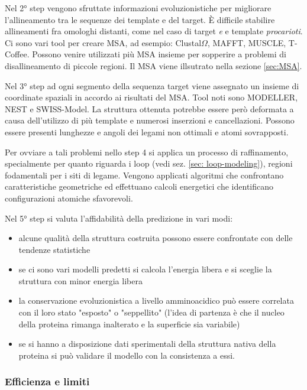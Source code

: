 \par Nel 2° step vengono sfruttate informazioni evoluzionistiche per migliorare l'allineamento tra le sequenze dei template e del target. È difficile stabilire allineamenti fra omologhi distanti, come nel caso di target \textit{e} e template \textit{procarioti}. Ci sono vari tool per creare MSA, ad esempio: Clustal$\Omega$, MAFFT, MUSCLE, T-Coffee. Possono venire utilizzati più MSA insieme per sopperire a problemi di disallineamento di piccole regioni. Il MSA viene illsutrato nella sezione \ref{sec:MSA}.

\par Nel 3° step ad ogni segmento della sequenza target viene assegnato un insieme di coordinate spaziali in accordo ai risultati del MSA. Tool noti sono MODELLER, NEST e SWISS-Model. La struttura ottenuta potrebbe essere però deformata a causa dell'utilizzo di più template e numerosi inserzioni e cancellazioni. Possono essere presenti lunghezze e angoli dei legami non ottimali e atomi sovrapposti.

\par Per ovviare a tali problemi nello step 4 si applica un processo di raffinamento, specialmente per quanto riguarda i loop (vedi sez. \ref{sec: loop-modeling}), regioni fodamentali per i siti di legame. Vengono applicati algoritmi che confrontano caratteristiche geometriche ed effettuano calcoli energetici che identificano configurazioni atomiche sfavorevoli. 

\par Nel 5° step si valuta l'affidabilità della predizione in vari modi:
\begin{itemize}
	\item alcune qualità della struttura costruita possono essere confrontate con delle tendenze statistiche
	\item se ci sono vari modelli predetti si calcola l'energia libera e si sceglie la struttura con minor energia libera
	\item la conservazione evoluzionistica a livello amminoacidico può essere correlata con il loro stato "esposto" o "seppellito" (l'idea di partenza è che il nucleo della proteina rimanga inalterato e la superficie sia variabile)
	\item se si hanno a disposizione dati sperimentali della struttura nativa della proteina si può validare il modello con la consistenza a essi.
\end{itemize}

\subsubsection{Efficienza e limiti}

